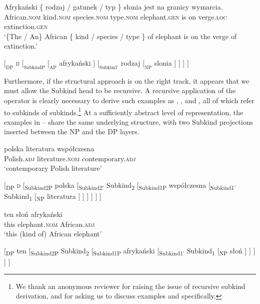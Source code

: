 \documentclass[output=paper,
colorlinks,
citecolor=brown,
newtxmath
]{langscibook}
\begin{document}
\ea \gll
Afrykański \{ rodzaj / gatunek / typ \} słonia jest na granicy wymarcia.\\
African.\textsc{nom} { } kind.\textsc{nom} { } species.\textsc{nom} { } type.\textsc{nom} { } elephant.\textsc{gen} is on verge.\textsc{loc} extinction.\textsc{gen}\\
\glt `\{The / An\} African \{ kind / species / type \} of elephant is on the verge of extinction.'
\label{ex:kind_head}
\z

\ea $[_\text{DP}$ \textsc{d} $[_\text{SubkindP}$ $[_\text{AP}$ afrykański $]$ $[_\text{Subkind'}$ rodzaj $[_\text{NP}$ slonia ] ] ] ]
\label{ex:structure_2}
\z

\noindent
Furthermore, if the structural approach is on the right track, it appears that we must allow the Subkind head to be recursive. A recursive application of the  operator is clearly necessary to derive such examples as , , and , all of which refer to subkinds of subkinds.\footnote{We thank an anonymous reviewer for raising the issue of recursive subkind derivation, and for asking us to discuss examples  and  specifically.} At a sufficiently abstract level of representation, the examples in -- share the same underlying structure, with two Subkind projections inserted between the NP and the DP layers.

\ea \label{ex:recursive_1}
\ea \gll
polska literatura współczesna\\
Polish.\textsc{adj} literature.\textsc{nom} contemporary.\textsc{adj}\\
\glt `contemporary Polish literature'

\ex
{}[\textsubscript{DP} \textsc{d} [\textsubscript{Subkind2P} polska [\textsubscript{Subkind2'} Subkind\textsubscript{2} [\textsubscript{Subkind1P} współczesna [\textsubscript{Subkind1'} Subkind\textsubscript{1} [\textsubscript{NP} literatura ] ] ] ] ] ]
\z \z

\ea \label{ex:recursive_2}
\ea \gll
ten słoń afrykański\\
this elephant.\textsc{nom} African.\textsc{adj}\\
\glt `this (kind of) African elephant'

\ex
{}[\textsubscript{DP} ten [\textsubscript{Subkind2P} Subkind\textsubscript{2} [\textsubscript{Subkind1P} afrykański [\textsubscript{Subkind1'} Subkind\textsubscript{1} [\textsubscript{NP} słoń ] ] ] ] ]
\z \z
\end{document}
